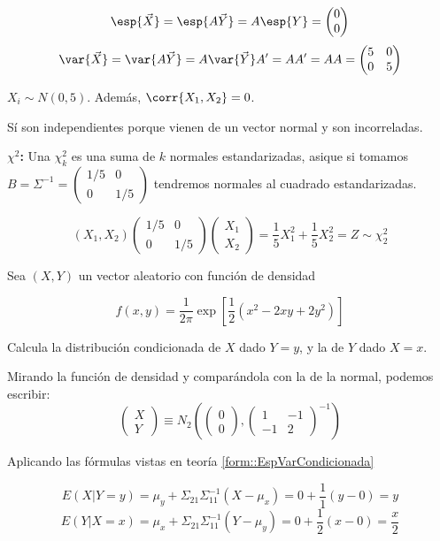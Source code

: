 \begin{problem}[4]
\[
\esp{\vec{X}} = \esp{A\vec{Y}} = A\esp{Y} = \begin{pmatrix}0\\0\end{pmatrix}
\]
\[
\var{\vec{X}} = \var{A\vec{Y}} = A\var{\vec{Y}}A' = AA' = AA = \begin{pmatrix} 5&0\\0&5\end{pmatrix}
\]

\spart $X_i \sim N(0,5)$. Además, $\corr{X_1,X_2} = 0$.

Sí son independientes porque vienen de un vector normal y son incorreladas.


\textbf{$\chi^2$:} Una $\chi^2_k$ es una suma de $k$ normales estandarizadas, asique si tomamos $B = Σ^{-1} = \begin{pmatrix}1/5&0\\0&1/5\end{pmatrix}$ tendremos normales al cuadrado estandarizadas.

\[
(X_1,X_2)\begin{pmatrix}1/5&0\\0&1/5\end{pmatrix}\begin{pmatrix}X_1\\X_2\end{pmatrix} = \frac{1}{5}X_1^2 + \frac{1}{5}X_2^2 = Z\sim \chi^2_2
\]



\end{problem}

\begin{problem}[5]

Sea $(X, Y )$ un vector aleatorio con función de densidad

\[
f (x, y) = \frac{1}{2π}\exp\left[\frac{1}{2}\left(x^2 − 2xy + 2y^2\right)\right]
\]

\ppart Calcula la distribución condicionada de $X$ dado $Y = y$, y la de $Y$ dado $X = x$.

\solution

Mirando la función de densidad y comparándola con la de la normal, podemos escribir:
\[
\begin{pmatrix}X\\Y \end{pmatrix} \equiv N_2\left(\begin{pmatrix}0\\0\end{pmatrix},\begin{pmatrix}1&-1\\-1&2\end{pmatrix}^{-1}\right)
\]

Aplicando las fórmulas vistas en teoría \ref{form::EspVarCondicionada}

\[
E(X|Y=y) = μ_y + Σ_{21}Σ_{11}^{-1}(X-μ_x) = 0 + \frac{1}{1}(y-0) = y
\]
\[
E(Y|X=x) = μ_x + Σ_{21}Σ_{11}^{-1}(Y-μ_y) = 0 + \frac{1}{2}(x-0) = \frac{x}{2}
\]

\end{problem}

